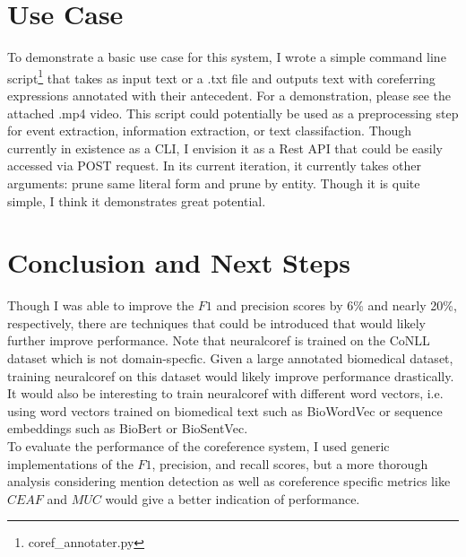 \documentclass[11pt]{article}
\begin{document}
\section{Use Case}
To demonstrate a basic use case for this system, I wrote a simple command line script\footnote{coref\_annotater.py} that takes as input text or a .txt file and outputs text with coreferring expressions annotated with their antecedent. For a demonstration, please see the attached .mp4 video. This script could potentially be used as a preprocessing step for event extraction, information extraction, or text classifaction. Though currently in existence as a CLI, I envision it as a Rest API that could be easily accessed via POST request. In its current iteration, it currently takes other arguments: prune same literal form and prune by entity. Though it is quite simple, I think it demonstrates great potential. \\

\section{Conclusion and Next Steps}
Though I was able to improve the $F1$ and precision scores by 6\% and nearly 20\%, respectively, there are techniques that could be introduced that would likely further improve performance. Note that neuralcoref is trained on the CoNLL  dataset which is not domain-specfic. Given a large annotated biomedical dataset, training neuralcoref on this dataset would likely improve performance drastically. It would also be interesting to train neuralcoref with different word vectors, i.e. using word vectors trained on biomedical text such as BioWordVec or sequence embeddings such as BioBert or BioSentVec. \\
To evaluate the performance of the coreference system, I used generic implementations of the $F1$, precision, and recall scores, but a more thorough analysis considering mention detection as well as coreference specific metrics like $CEAF$ and $MUC$ would give a better indication of performance. \\ 

\newpage


\nocite{pilehvar-collier-2016-improved, choi-etal-2014-analysis, Prokofyev:2015:SOC:2942298.2942337, clark-manning-2016-improving}
\end{document}
